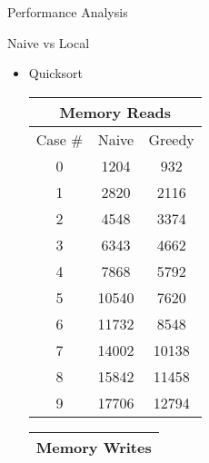 \documentclass[letterpaper,12pt]{article}
\theoremstyle{definition}
\begin{document}
\begin{section}{Performance Analysis}
\begin{subsection}{Naive vs Local}
\begin{itemize}
                \item Quicksort
                    \begin{table}[H]
                        \begin{minipage}{.4\textwidth}
                            \centering
                            \begin{tabular}{|c|c|c|}
                                \hline
                                \multicolumn{3}{|c|}{Memory Reads}\\
                                \hline
                                Case \# & Naive & Greedy \\
                                \hline
                                0 & 1204 & 932 \\
                                \hline
                                1 & 2820 & 2116 \\
                                \hline
                                2 & 4548 & 3374 \\
                                \hline
                                3 & 6343 & 4662 \\
                                \hline
                                4 & 7868 & 5792 \\
                                \hline
                                5 & 10540 & 7620 \\
                                \hline
                                6 & 11732 & 8548 \\
                                \hline
                                7 & 14002 & 10138 \\
                                \hline
                                8 & 15842 & 11458 \\
                                \hline
                                9 & 17706 & 12794 \\
                                \hline
                            \end{tabular}
                        \end{minipage}
                        \hfill
                        \begin{minipage}{.4\textwidth}
                            \centering
                            \begin{tabular}{|c|c|c|}
                                \hline
                                \multicolumn{3}{|c|}{Memory Writes}\\
                                \hline

\end{tabular}
\end{minipage}
\end{table}
\end{itemize}
\end{subsection}
\end{section}
\end{document}
